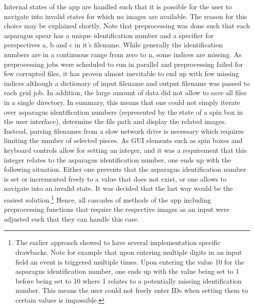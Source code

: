 Internal states of the app are handled such that it is possible for the user to navigate into invalid states for which no images are available. The reason for this choice may be explained shortly. Note that preprocessing was done such that each asparagus spear has a unique identification number and a specifier for perspectives a, b and c in it’s filename. While generally the identification numbers are in a continuous range from zero to n, some indices are missing. As preprocessing jobs were scheduled to run in parallel and preprocessing failed for few corrupted files, it has proven almost inevitable to end up with few missing indices although a dictionary of input filename and output filename was passed to each grid job. In addition, the large amount of data did not allow to save all files in a single directory. In summary, this means that one could not simply iterate over asparagus identification numbers (represented by the state of a spin box in the user interface), determine the file path and display the related images. Instead, parsing filenames from a slow network drive is necessary which requires limiting the number of selected pieces. As GUI elements such as spin boxes and keyboard controls allow for setting an integer, and it was a requirement that this integer relates to the asparagus identification number, one ends up with the following situation. Either one prevents that the asparagus identification number is set or incremented freely to a value that does not exist, or one allows to navigate into an invalid state. It was decided that the last way would be the easiest solution.\footnote{The earlier approach showed to have several implementation specific drawbacks. Note for example that upon entering multiple digits in an input field an event is triggered multiple times. Upon entering the value 10 for the asparagus identification number, one ends up with the value being set to 1 before being set to 10 where 1 relates to a potentially missing identification number. This means the user could not freely enter IDs when setting them to certain values is impossible.} Hence, all cascades of methods of the app including preprocessing functions that require the respective images as an input were adjusted such that they can handle this case. 

